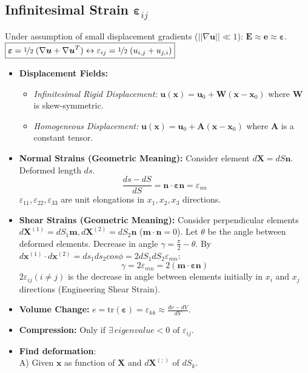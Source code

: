 \documentclass[10pt,twocolumn, a4paper]{article}
\begin{document}
\subsection{Infinitesimal Strain $\bm{\varepsilon}_{ij}$}
Under assumption of small displacement gradients ($||\nabla \bm{u}|| \ll 1$): $\bm{E} \approx \bm{e} \approx \bm{\varepsilon}$. $\boxed{\bm{\varepsilon} = \nicefrac{1}{2}\;(\nabla\bm{u}+\nabla\bm{u}^T) \leftrightarrow\varepsilon_{ij}=\nicefrac{1}{2}\;(u_{i,j}+u_{j,i})}$
\begin{itemize}
    \item \textbf{Displacement Fields:}
    \begin{itemize}
        \item \textit{Infinitesimal Rigid Displacement:} $\bm{u}(\bm{x}) = \bm{u}_0 + \bm{W}(\bm{x} - \bm{x}_0)$ where $\bm{W}$ is skew-symmetric.
        \item \textit{Homogeneous Displacement:} $\bm{u}(\bm{x}) = \bm{u}_0 + \bm{A}(\bm{x} - \bm{x}_0)$ where $\bm{A}$ is a constant tensor.
    \end{itemize}
    \item \textbf{Normal Strains (Geometric Meaning):}
    Consider element $d\bm{X} = dS \bm{n}$. Deformed length $ds$.
    $$ \frac{ds - dS}{dS} = \bm{n} \cdot \bm{\varepsilon} \bm{n} = \varepsilon_{nn} $$
    $\varepsilon_{11}, \varepsilon_{22}, \varepsilon_{33}$ are unit elongations in $x_1, x_2, x_3$ directions.
    \item \textbf{Shear Strains (Geometric Meaning):}
    Consider perpendicular elements $d\bm{X}^{(1)} = dS_1 \bm{m}, d\bm{X}^{(2)} = dS_2 \bm{n}$ ($\bm{m} \cdot \bm{n} = 0$).
    Let $\theta$ be the angle between deformed elements. Decrease in angle $\gamma = \frac{\pi}{2} - \theta$. By $d\bm{x}^{(1)}\cdot d\bm{x}^{(2)} = ds_1ds_2cos\phi = 2dS_1dS_2\varepsilon_{mn}$:
    $$ \gamma = 2\varepsilon_{mn} = 2(\bm{m} \cdot \bm{\varepsilon} \bm{n}) $$
    $2\varepsilon_{ij} (i \neq j)$ is the decrease in angle between elements initially in $x_i$ and $x_j$ directions (Engineering Shear Strain).
    \item \textbf{Volume Change:} $e = \text{tr}(\bm{\varepsilon}) = \varepsilon_{kk} \approx \frac{dv - dV}{dV}$.
    \item \textbf{Compression: } Only if $\exists \,eigenvalue < 0 \text{ of } \varepsilon_{ij}$. 
    \item \textbf{Find deformation}: \\
    A) Given $\bm{x}$ as function of $\bm{X}$ and $d\bm{X^{(;)}}$ of $dS_k$. \\

\end{itemize}
\end{document}
